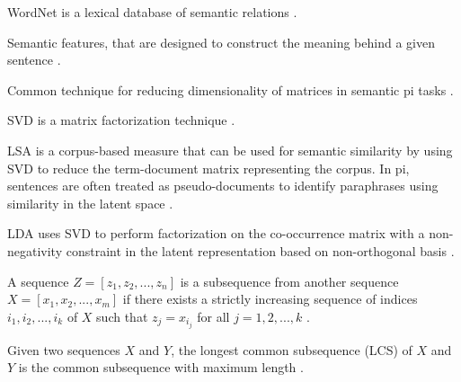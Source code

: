 \begin{definition}
    [WordNet]
    WordNet is a lexical database of semantic relations \cite{zhou_paraphrase_2025}.
\end{definition}

\begin{definition}
    Semantic features, that are designed to construct the meaning behind a given sentence \cite{zhou_paraphrase_2025}.
\end{definition}

\begin{definition}
    Common technique for reducing dimensionality of matrices in semantic \ac{pi} tasks \cite{zhou_paraphrase_2025}.
\end{definition}

\begin{definition}
    SVD is a matrix factorization technique \cite{zhou_paraphrase_2025}.
\end{definition}

\begin{definition}
    LSA is a corpus-based measure that can be used for semantic similarity by using SVD to reduce the term-document matrix representing the corpus.
    In \ac{pi}, sentences are often treated as pseudo-documents to identify paraphrases using similarity in the latent space \cite{zhou_paraphrase_2025}.
\end{definition}

\begin{definition}
    LDA uses SVD to perform factorization on the co-occurrence matrix with a non-negativity constraint in the latent representation based on non-orthogonal basis \cite{zhou_paraphrase_2025}.
\end{definition}

\begin{definition}
    [Subsequence]
    A sequence $Z=[z_1, z_2, ..., z_n]$ is a subsequence from another sequence $X=[x_1, x_2, ..., x_m]$ if there exists a strictly increasing sequence of indices $i_1, i_2, ..., i_k$ of $X$ such that $z_j = x_{i_j}$ for all $j=1, 2, ..., k$ \cite{lin_rouge_2004}.
\end{definition}

\begin{definition}
    Given two sequences $X$ and $Y$, the longest common subsequence (LCS) of $X$ and $Y$ is the common subsequence with maximum length \cite{lin_rouge_2004}.
\end{definition}